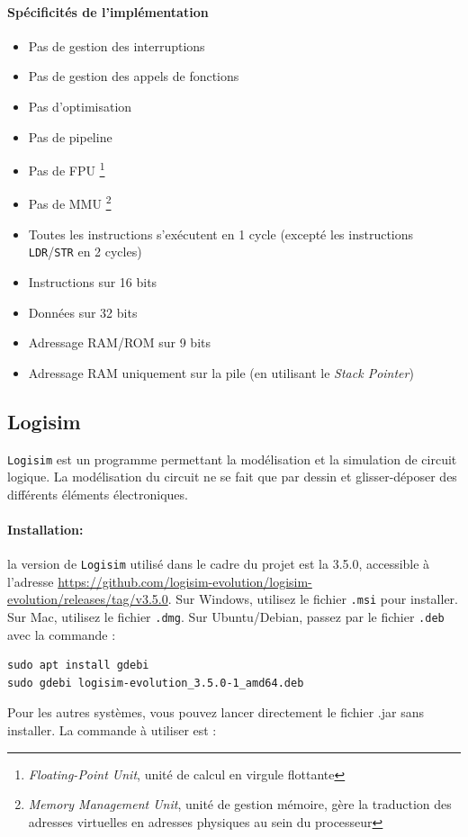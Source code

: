 \documentclass{article}
\begin{document}
    \paragraph{Spécificités de l'implémentation}
    \begin{itemize}
        \item Pas de gestion des interruptions
        \item Pas de gestion des appels de fonctions
        \item Pas d'optimisation
        \item Pas de pipeline
        \item Pas de FPU \footnote{\textit{Floating-Point Unit}, unité de calcul en virgule flottante}
        \item Pas de MMU \footnote{\textit{Memory Management Unit}, unité de gestion mémoire, gère la traduction des adresses virtuelles en adresses physiques au sein du processeur}
        \item Toutes les instructions s'exécutent en 1 cycle (excepté les instructions \texttt{LDR}/\texttt{STR} en 2 cycles)
        \item Instructions sur 16 bits
        \item Données sur 32 bits
        \item Adressage RAM/ROM sur 9 bits
        \item Adressage RAM uniquement sur la pile (en utilisant le \textit{Stack Pointer})
    \end{itemize}

    \subsection{Logisim}

    \texttt{Logisim} est un programme permettant la modélisation et la simulation de circuit logique.
    La modélisation du circuit ne se fait que par dessin et glisser-déposer des différents éléments électroniques.

    \paragraph{Installation:} la version de \texttt{Logisim} utilisé dans le cadre du projet est la 3.5.0, accessible à l'adresse \url{https://github.com/logisim-evolution/logisim-evolution/releases/tag/v3.5.0}.
    Sur Windows, utilisez le fichier \texttt{.msi} pour installer.
    Sur Mac, utilisez le fichier \texttt{.dmg}.
    Sur Ubuntu/Debian, passez par le fichier \texttt{.deb} avec la commande :
    \begin{lstlisting}
sudo apt install gdebi
sudo gdebi logisim-evolution_3.5.0-1_amd64.deb
    \end{lstlisting}
    Pour les autres systèmes, vous pouvez lancer directement le fichier .jar sans installer. La commande à utiliser est :
    
\end{document}
